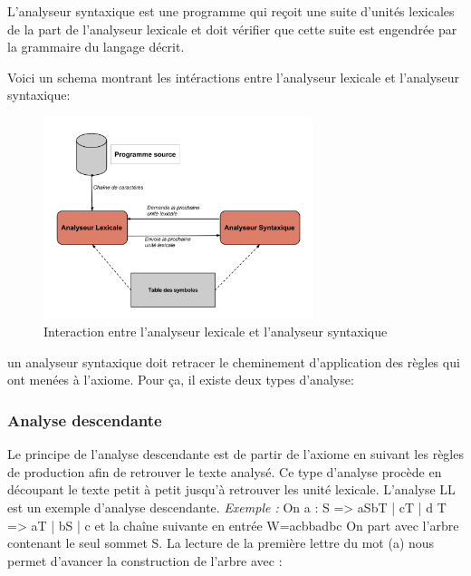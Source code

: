 \documentclass{article}
\begin{document}
L'analyseur syntaxique est une programme qui reçoit une suite d'unités lexicales de la part de l'analyseur lexicale et doit vérifier que cette suite est engendrée par la grammaire du langage décrit.

Voici un schema montrant les intéractions entre l'analyseur lexicale et l'analyseur syntaxique:

\begin{figure}[h!]
	\centering
		\includegraphics[width=0.70\textwidth]{interactionLexSynt.png}
	\caption{Interaction entre l'analyseur lexicale et l'analyseur syntaxique}
	\label{fig:interactionLexSynt}
\end{figure}\FloatBarrier
\newline
un analyseur syntaxique doit retracer le cheminement d’application des règles qui ont menées à l’axiome. Pour ça, il existe deux types d’analyse:

\subsubsection{Analyse descendante}\label{sec:analyseDes}
Le principe de l’analyse descendante est de partir de l’axiome en suivant les règles de production afin de retrouver le texte analysé. Ce type d’analyse procède en découpant le texte petit à petit jusqu'à retrouver les unité lexicale. L’analyse LL est un exemple d’analyse descendante.\newline
\textit{Exemple :}\newline
On a :\newline
S => aSbT | cT | d\newline
T => aT | bS | c \newline
et la chaîne suivante en entrée W=acbbadbc\newline
On part avec l'arbre contenant le seul sommet S.
La lecture de la première lettre du mot (a) nous permet d'avancer la construction de l'arbre avec :
\end{document}
